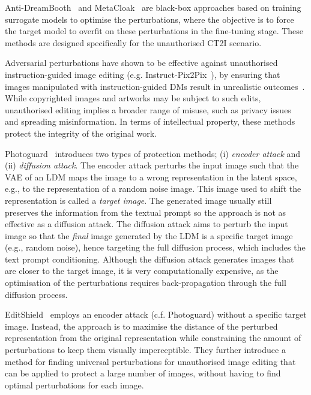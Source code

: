 \documentclass[conference,table]{IEEEtran}
\begin{document}
Anti-DreamBooth~\cite{van_le_anti-dreambooth_2023} and MetaCloak~\cite{liu_toward_2023} are black-box approaches based on training surrogate models to optimise the perturbations, where the objective is to force the target model to overfit on these perturbations in the fine-tuning stage. These methods are designed specifically for the unauthorised CT2I scenario.

Adversarial perturbations have shown to be effective against unauthorised instruction-guided image editing (e.g. Instruct-Pix2Pix~\cite{brooks_instructpix2pix_2023}),
by ensuring that images manipulated with instruction-guided DMs result in unrealistic outcomes~\cite{chen_editshield_2023,salman_raising_2023}. 
While copyrighted images and artworks may be subject to such edits, unauthorised editing implies a broader range of misuse, such as privacy issues and spreading misinformation.
In terms of intellectual property, these methods protect the integrity of the original work. 

Photoguard~\cite{salman_raising_2023} introduces two types of protection methods; (i) \textit{encoder attack} and (ii) \textit{diffusion attack}.
The encoder attack perturbs the input image such that the VAE of an LDM maps the image to a wrong representation in the latent space, e.g., to the representation of a random noise image. This image used to shift the representation is called a \textit{target image}. 
The generated image usually still preserves the information from the textual prompt so the approach is not as effective as a diffusion attack.
The diffusion attack aims to perturb the input image so that the \textit{final} image generated by the LDM is a specific target image (e.g., random noise), hence targeting the full diffusion process, which includes the text prompt conditioning.
Although the diffusion attack generates images that are closer to the target image, it is very computationally expensive, as the optimisation of the perturbations requires back-propagation through the full diffusion process.

EditShield~\cite{chen_editshield_2023} employs an encoder attack (c.f. Photoguard) without a specific target image. 
Instead, the approach is to maximise the distance of the perturbed representation from the original representation while constraining the amount of perturbations to keep them visually imperceptible. 
They further introduce a method for finding universal perturbations for unauthorised image editing that can be applied to protect a large number of images, without having to find optimal perturbations for each image. 
\end{document}
